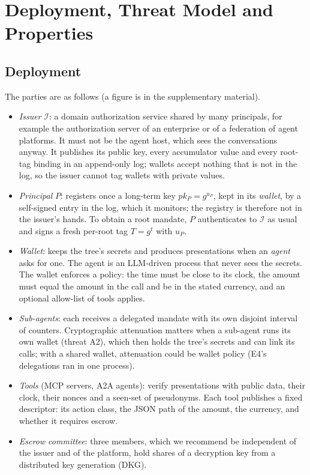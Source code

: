 \section{Deployment, Threat Model and Properties}\label{sec:model}
\subsection{Deployment}
The parties are as follows (a figure is in the supplementary material).
\begin{itemize}
\item \emph{Issuer} $\mathcal{I}$: a domain authorization service shared by many principals, for example the authorization server of an enterprise or of a federation of agent platforms. It must not be the agent host, which sees the conversations anyway. It publishes its public key, every accumulator value and every root-tag binding in an append-only log; wallets accept nothing that is not in the log, so the issuer cannot tag wallets with private values.
\item \emph{Principal} $P$: registers once a long-term key $pk_P=g^{u_P}$, kept in its \emph{wallet}, by a self-signed entry in the log, which it monitors; the registry is therefore not in the issuer's hands. To obtain a root mandate, $P$ authenticates to $\mathcal{I}$ as usual and signs a fresh per-root tag $T=g^{t}$ with $u_P$.
\item \emph{Wallet}: keeps the tree's secrets and produces presentations when an \emph{agent} asks for one. The agent is an LLM-driven process that never sees the secrets. The wallet enforces a policy: the time must be close to its clock, the amount must equal the amount in the call and be in the stated currency, and an optional allow-list of tools applies.
\item \emph{Sub-agents}: each receives a delegated mandate with its own disjoint interval of counters. Cryptographic attenuation matters when a sub-agent runs its own wallet (threat A2), which then holds the tree's secrets and can link its calls; with a shared wallet, attenuation could be wallet policy (E4's delegations ran in one process).
\item \emph{Tools} (MCP servers, A2A agents): verify presentations with public data, their clock, their nonces and a seen-set of pseudonyms. Each tool publishes a fixed descriptor: its action class, the JSON path of the amount, the currency, and whether it requires escrow.
\item \emph{Escrow committee}: three members, which we recommend be independent of the issuer and of the platform, hold shares of a decryption key from a distributed key generation (DKG).
\end{itemize}

